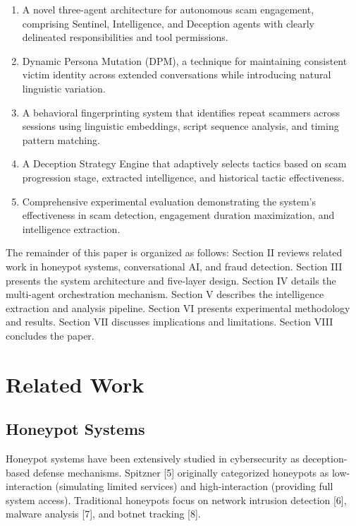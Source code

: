 \documentclass[conference]{IEEEtran}
\begin{document}
\begin{enumerate}
    \item A novel three-agent architecture for autonomous scam engagement, comprising Sentinel, Intelligence, and Deception agents with clearly delineated responsibilities and tool permissions.

    \item Dynamic Persona Mutation (DPM), a technique for maintaining consistent victim identity across extended conversations while introducing natural linguistic variation.

    \item A behavioral fingerprinting system that identifies repeat scammers across sessions using linguistic embeddings, script sequence analysis, and timing pattern matching.

    \item A Deception Strategy Engine that adaptively selects tactics based on scam progression stage, extracted intelligence, and historical tactic effectiveness.

    \item Comprehensive experimental evaluation demonstrating the system's effectiveness in scam detection, engagement duration maximization, and intelligence extraction.
\end{enumerate}

The remainder of this paper is organized as follows: Section II reviews related work in honeypot systems, conversational AI, and fraud detection. Section III presents the system architecture and five-layer design. Section IV details the multi-agent orchestration mechanism. Section V describes the intelligence extraction and analysis pipeline. Section VI presents experimental methodology and results. Section VII discusses implications and limitations. Section VIII concludes the paper.

\section{Related Work}

\subsection{Honeypot Systems}

Honeypot systems have been extensively studied in cybersecurity as deception-based defense mechanisms. Spitzner [5] originally categorized honeypots as low-interaction (simulating limited services) and high-interaction (providing full system access). Traditional honeypots focus on network intrusion detection [6], malware analysis [7], and botnet tracking [8].
\end{document}

